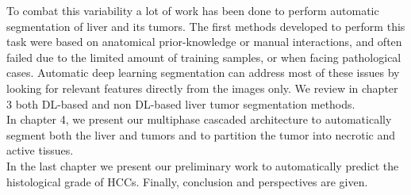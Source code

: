 To combat this variability a lot of work has been done to perform
automatic segmentation of liver and its tumors.
The first methods developed to perform this task were based on
anatomical prior-knowledge or manual interactions, and often failed due to  the limited amount of training samples, or when
facing pathological cases. Automatic deep learning segmentation can address most of these issues by looking for relevant features directly from the images only. We review in chapter 3 both DL-based and non DL-based liver tumor segmentation methods.\\
In chapter 4, we present our multiphase cascaded architecture to automatically segment both the liver and tumors and to partition the tumor into necrotic and active tissues.\\
In the last chapter we present our preliminary work to automatically predict the histological grade of HCCs.
Finally, conclusion and perspectives are given.




